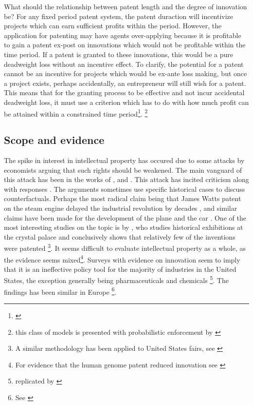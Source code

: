 What should the relationship between patent length and the degree of innovation be? For any fixed period patent system, the patent duraction will incentivize projects which can earn sufficient profits within the period. However, the application for patenting may have agents over-applying because it is profitable to gain a patent ex-post on innovations which would not be profitable within the time period. If a patent is granted to these innovations, this would be a pure deadweight loss without an incentive effect. To clarify, the potential for a patent cannot be an incentive for projects which would be ex-ante loss making, but once a project exists, perhaps accidentally, an entrepreneur will still wish for a patent. This means that for the granting process to be effective and not incur accidental deadweight loss, it must use a criterion which has to do with how much profit can be attained within a constrained time period\footnote{\cite{ODonoghue1998}}. \footnote{this class of models is presented with probabilistic enforcement by \cite{Chou2007} }

\subsection{Scope and evidence}

The spike in interest in intellectual property has occured due to some attacks by economists arguing that such rights should be weakened. The main vanguard of this attack has been in the works of \cite{dosi2006much}, \cite{boldrinlevine} and  \cite{bessen2008patent}. This attack has incited criticism \citep{scherer2009michele} along with responses \citep{boldrin2013s}. The arguments sometimes use specific historical cases to discuss counterfactuals. Perhaps the most radical claim being that James Watts patent on the steam engine delayed the industrial revolution by decades \citep{boldrinlevine} \citep{nuvolari2004collective}, and similar claims have been made for the development of the plane and the car \citep{merges1994limiting}. One of the most interesting studies on the topic is by \cite{moser2005patent}, who studies historical exhibitions at the crystal palace and conclusively shows that relatively few of the inventions were patented \citep{moser2005patent}\footnote{A similar methodology has been applied to United States fairs, see \cite{khan2013going}}. It seems difficult to evaluate intellectual property as a whole, as the evidence seems mixed\footnote{For evidence that the human genome patent reduced innovation see \cite{williams2013intellectual}}. Surveys with evidence on innovation seem to imply that it is an ineffective policy tool for the majority of industries in the United States, the exception generally being pharmaceuticals and chemicals \footnote{\citep{mansfield1986patents} \citep{levin1987appropriating} replicated by \citep{cohen2000protecting}}. The findings has been similar in Europe \footnote{See \citep{arundel1998percentage}}. 

